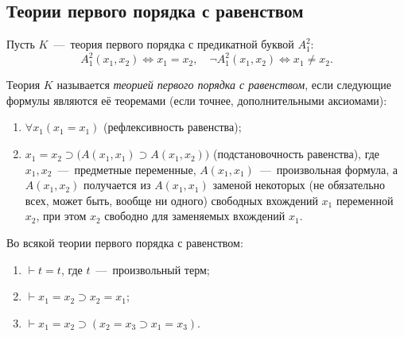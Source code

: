 \subsection{Теории первого порядка с равенством}
Пусть $K$~---~теория первого порядка с предикатной буквой $A_1^2$:
\[
    A_1^2(x_1, x_2) \Longleftrightarrow x_1 = x_2,\quad \neg A_1^2(x_1, x_2) \Longleftrightarrow x_1 \neq x_2.
\]
\begin{definition*}
    Теория $K$ называется \textit{теорией первого порядка с равенством}, если следующие формулы являются её теоремами (если точнее, дополнительными аксиомами):
    \begin{enumerate}[label=\Alph*.]
        \item $\forall x_1(x_1 = x_1)$ (рефлексивность равенства);
        \item $x_1 = x_2 \supset \big(A(x_1, x_1) \supset A(x_1, x_2)\big)$ (подстановочность равенства), где $x_1, x_2$~---~предметные переменные, $A(x_1, x_1)$~---~произвольная формула, а $A(x_1, x_2)$ получается из $A(x_1, x_1)$ заменой некоторых (не обязательно всех, может быть, вообще ни одного) свободных вхождений $x_1$ переменной $x_2$, при этом $x_2$ свободно для заменяемых вхождений $x_1$.
    \end{enumerate}
\end{definition*}
\begin{lemma}\label{th:eq_properties}
    Во всякой теории первого порядка с равенством:
    \begin{enumerate}[label=\arabic*)]
        \item $\vdash t = t$, где $t$~---~произвольный терм;
        \item $\vdash x_1 = x_2 \supset x_2 = x_1$;
        \item $\vdash x_1 = x_2 \supset (x_2 = x_3 \supset x_1 = x_3)$.
    \end{enumerate}
\end{lemma}
